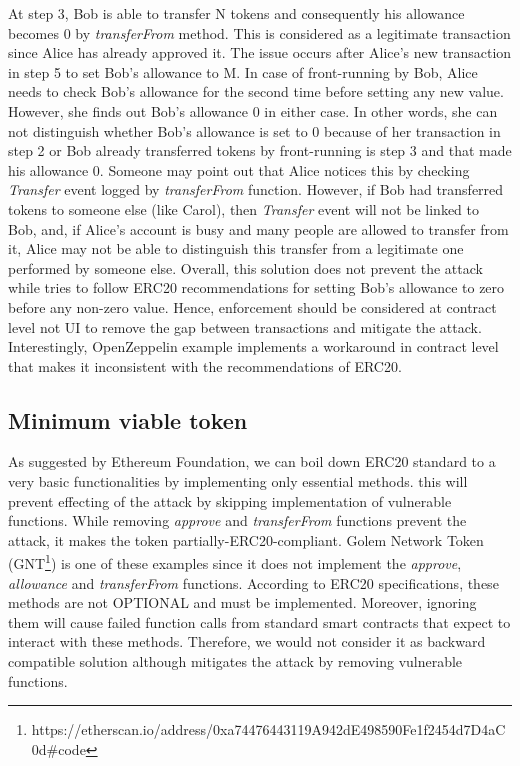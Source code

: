 At step 3, Bob is able to transfer N tokens and consequently his allowance becomes 0 by \textit{transferFrom} method. This is considered as a legitimate transaction since Alice has already approved it. The issue occurs after Alice’s new transaction in step 5 to set Bob's allowance to M. In case of front-running by Bob, Alice needs to check Bob’s allowance for the second time before setting any new value. However, she finds out Bob’s allowance 0 in either case. In other words, she can not distinguish whether Bob’s allowance is set to 0 because of her transaction in step 2 or Bob already transferred tokens by front-running is step 3 and that made his allowance 0. Someone may point out that Alice notices this by checking \textit{Transfer} event logged by \textit{transferFrom} function. However, if Bob had transferred tokens to someone else (like Carol), then \textit{Transfer} event will not be linked to Bob, and, if Alice’s account is busy and many people are allowed to transfer from it, Alice may not be able to distinguish this transfer from a legitimate one performed by someone else. Overall, this solution does not prevent the attack while tries to follow ERC20 recommendations for setting Bob’s allowance to zero before any non-zero value. Hence, enforcement should be considered at contract level not UI to remove the gap between transactions and mitigate the attack. Interestingly, OpenZeppelin example implements a workaround in contract level that makes it inconsistent with the recommendations of ERC20. 

\subsection{Minimum viable token}
As suggested by Ethereum Foundation\cite{Ref05}, we can boil down ERC20 standard to a very basic functionalities by implementing only essential methods. this will prevent effecting of the attack by skipping implementation of vulnerable functions. While removing \textit{approve} and \textit{transferFrom} functions prevent the attack, it makes the token partially-ERC20-compliant. Golem Network Token (GNT\footnote{https://etherscan.io/address/0xa74476443119A942dE498590Fe1f2454d7\newline D4aC0d\#code}) is one of these examples since it does not implement the \textit{approve}, \textit{allowance} and \textit{transferFrom} functions. According to ERC20 specifications\cite{Ref08}, these methods are not OPTIONAL and must be implemented. Moreover, ignoring them will cause failed function calls from standard smart contracts that expect to interact with these methods. Therefore, we would not consider it as backward compatible solution although mitigates the attack by removing vulnerable functions.

